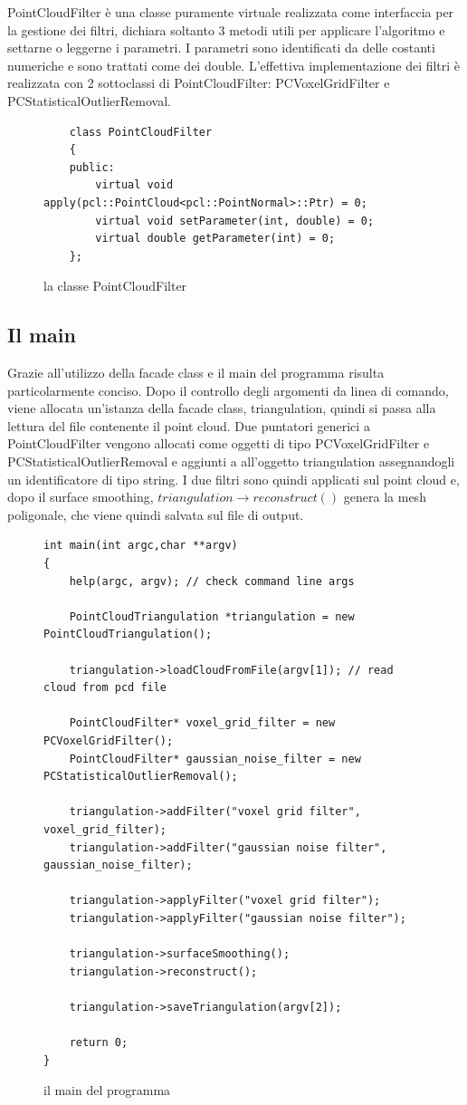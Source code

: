 \documentclass[a4paper,12pt]{article}
\begin{document}
	PointCloudFilter è una classe puramente virtuale realizzata come interfaccia per la gestione dei filtri,
	dichiara soltanto 3 metodi utili per applicare l'algoritmo e settarne o leggerne i parametri.
	I parametri sono identificati da delle costanti numeriche e sono trattati come dei double.
	L'effettiva implementazione dei filtri è realizzata con 2 sottoclassi di PointCloudFilter: PCVoxelGridFilter
	e PCStatisticalOutlierRemoval.
	\ 
	\begin{figure}[H]
	\begin{lstlisting}
	class PointCloudFilter
	{
	public:
    	virtual void apply(pcl::PointCloud<pcl::PointNormal>::Ptr) = 0;
    	virtual void setParameter(int, double) = 0;
    	virtual double getParameter(int) = 0;
	};
	\end{lstlisting}
	\label{fig:PointCloudFilter}
	\caption{la classe PointCloudFilter}
	\end{figure}
	\clearpage
	\subsection{Il main}
	Grazie all'utilizzo della facade class e il main del programma risulta particolarmente conciso.
	Dopo il controllo degli argomenti da linea di comando, viene allocata un'istanza della facade class, 
	triangulation, quindi si passa alla lettura del file contenente il point cloud. 
	Due puntatori generici a PointCloudFilter vengono allocati come oggetti di tipo PCVoxelGridFilter e
	PCStatisticalOutlierRemoval e aggiunti a all'oggetto triangulation assegnandogli un identificatore di
	tipo string. I due filtri sono quindi applicati sul point cloud e, dopo il surface smoothing, 
	$triangulation\rightarrow reconstruct()$ genera la mesh poligonale, che viene quindi salvata sul file di output.
	\begin{figure}[H]
	\begin{lstlisting}
int main(int argc,char **argv)
{
    help(argc, argv); // check command line args
    
    PointCloudTriangulation *triangulation = new PointCloudTriangulation();

    triangulation->loadCloudFromFile(argv[1]); // read cloud from pcd file

    PointCloudFilter* voxel_grid_filter = new PCVoxelGridFilter();
    PointCloudFilter* gaussian_noise_filter = new PCStatisticalOutlierRemoval();

    triangulation->addFilter("voxel grid filter", voxel_grid_filter);
    triangulation->addFilter("gaussian noise filter", gaussian_noise_filter);

    triangulation->applyFilter("voxel grid filter");
    triangulation->applyFilter("gaussian noise filter");

    triangulation->surfaceSmoothing();
    triangulation->reconstruct();

    triangulation->saveTriangulation(argv[2]);

    return 0;
}
	\end{lstlisting}
	\label{fig:main}
	\caption{il main del programma}	
	\end{figure}
	\clearpage
\end{document}
